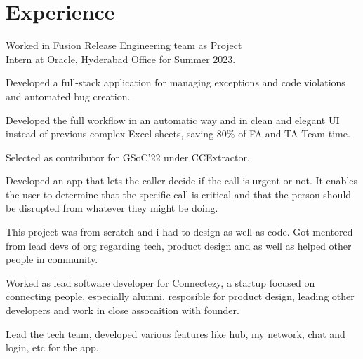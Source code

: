 \documentclass[]{deedy-resume-openfont}
\begin{document}
\hfill
\begin{minipage}[t]{0.69\textwidth} 

\section{Experience}

\hfill {}
\begin{tightemize}
    \item Worked in Fusion Release Engineering team as Project
    \\ Intern at Oracle, Hyderabad Office for Summer 2023.
    \item Developed a full-stack application for managing exceptions and code violations and automated bug creation.
    \item Developed the full workflow in an automatic way and in clean and elegant UI instead of previous complex Excel sheets, saving 80$\%$ of FA and TA Team time.
\end{tightemize}
\sectionsep

\hfill {}
\begin{tightemize}
    \item Selected as contributor for GSoC'22 under CCExtractor.
    \item Developed an app that lets the caller decide if the call is urgent or not. It enables the user to determine that the specific call is critical and that the person should be disrupted from whatever they might be doing.
    \item This project was from scratch and i had to design as well as code. Got mentored from lead devs of org regarding tech, product design and as well as helped other people in community.
\end{tightemize}
\sectionsep

\hfill {}
\begin{tightemize}
    \item Worked as lead software developer for Connectezy, a startup focused on connecting people, especially alumni, resposible for product design, leading other developers and work in close assocaition with founder.
    \item Lead the tech team, developed various features like hub, my network, chat and login, etc for the app. 
\end{tightemize}
\sectionsep


\end{minipage}
\end{document}
